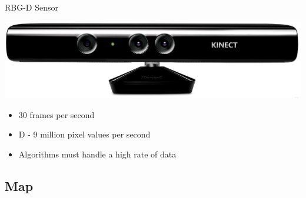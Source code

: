 \begin{frame}{RBG-D Sensor} %
  \begin{center}
    \includegraphics[width=\textwidth]{../figures/presentation/intro_kinect.jpeg}
  \end{center}
  \begin{itemize}
    \item 30 frames per second
    \item D - 9 million pixel values per second
    \item Algorithms must handle a high rate of data
  \end{itemize}

\end{frame}

\subsection{Map}

